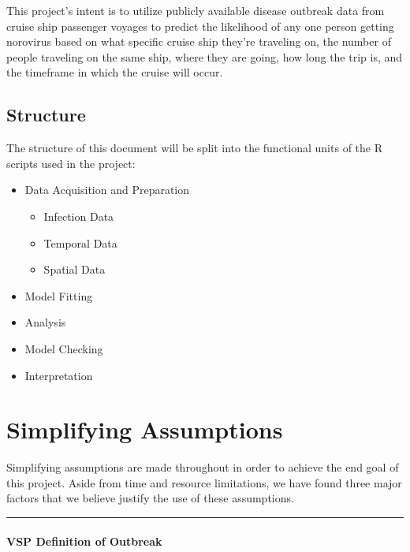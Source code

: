 \documentclass[
  11,
]{book}
\begin{document}
This project's intent is to utilize publicly available disease outbreak data from cruise ship passenger voyages to predict the likelihood of any one person getting norovirus based on what specific cruise ship they're traveling on, the number of people traveling on the same ship, where they are going, how long the trip is, and the timeframe in which the cruise will occur.

\hypertarget{structure}{%
\subsection*{Structure}\label{structure}}


The structure of this document will be split into the functional units of the R scripts used in the project:

\begin{itemize}
\item
  Data Acquisition and Preparation

  \begin{itemize}
  \item
    Infection Data
  \item
    Temporal Data
  \item
    Spatial Data
  \end{itemize}
\item
  Model Fitting
\item
  Analysis
\item
  Model Checking
\item
  Interpretation
\end{itemize}

\hypertarget{simplifying-assumptions}{%
\section*{Simplifying Assumptions}\label{simplifying-assumptions}}


Simplifying assumptions are made throughout in order to achieve the end goal of this project. Aside from time and resource limitations, we have found three major factors that we believe justify the use of these assumptions.

\begin{center}\rule{0.5\linewidth}{0.5pt}\end{center}

\hypertarget{vsp-definition-of-outbreak}{%
\paragraph*{VSP Definition of Outbreak}\label{vsp-definition-of-outbreak}}
\end{document}
